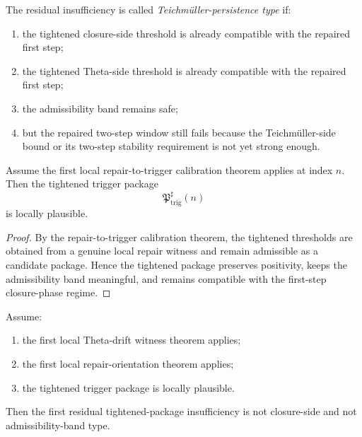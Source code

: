 \begin{definition}
\label{def:teichmueller-persistence-residual-insufficiency}
The residual insufficiency is called \emph{Teichm\"uller-persistence type} if:
\begin{enumerate}
    \item the tightened closure-side threshold is already compatible with the repaired first step;
    \item the tightened Theta-side threshold is already compatible with the repaired first step;
    \item the admissibility band remains safe;
    \item but the repaired two-step window still fails because the Teichm\"uller-side bound or its two-step stability requirement is not yet strong enough.
\end{enumerate}
\end{definition}

\begin{proposition}
\label{prop:the-tightened-package-is-locally-plausible}
Assume the first local repair-to-trigger calibration theorem applies at index $n$.
Then the tightened trigger package
\[
\mathfrak{P}_{\mathrm{trig}}^{\sharp}(n)
\]
is locally plausible.
\end{proposition}

\begin{proof}
By the repair-to-trigger calibration theorem, the tightened thresholds are obtained from a genuine local repair witness and remain admissible as a candidate package.
Hence the tightened package preserves positivity, keeps the admissibility band meaningful, and remains compatible with the first-step closure-phase regime.
\end{proof}

\begin{proposition}
\label{prop:closure-and-admissibility-are-not-the-first-remaining-insufficiency}
Assume:
\begin{enumerate}
    \item the first local Theta-drift witness theorem applies;
    \item the first local repair-orientation theorem applies;
    \item the tightened trigger package is locally plausible.
\end{enumerate}
Then the first residual tightened-package insufficiency is not closure-side and not admissibility-band type.
\end{proposition}

